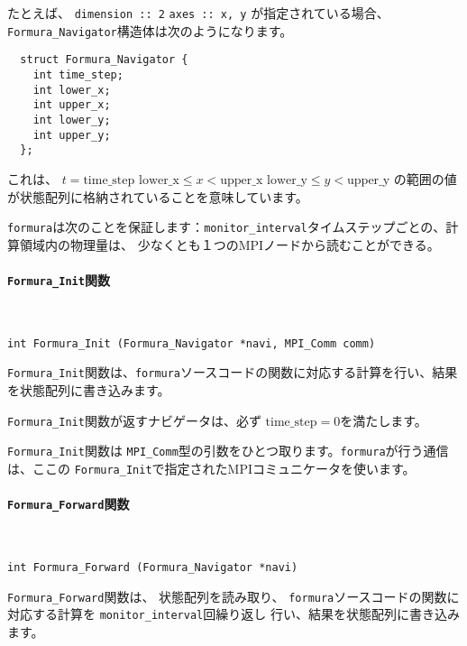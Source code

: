 \documentclass{jsarticle}
\newcommand{\formura}{{\texttt{formura}}}
\begin{document}
たとえば、
\verb`dimension :: 2`
\verb`axes :: x, y`
が指定されている場合、
\verb`Formura_Navigator`構造体は次のようになります。

\begin{screen}
\begin{verbatim}
  struct Formura_Navigator {
    int time_step;
    int lower_x;
    int upper_x;
    int lower_y;
    int upper_y;
  };
\end{verbatim}
\end{screen}

これは、
$t = \mathrm{time\_step}$
$\mathrm{lower\_x} \leq x < \mathrm{upper\_x}$
$\mathrm{lower\_y} \leq y < \mathrm{upper\_y}$
の範囲の値が状態配列に格納されていることを意味しています。

\formura は次のことを保証します：\verb`monitor_interval`タイムステップごとの、計算領域内の物理量は、
少なくとも１つのMPIノードから読むことができる。


\paragraph{\texttt{Formura\_Init}関数} \leavevmode\\

\begin{screen}
\begin{verbatim}
int Formura_Init (Formura_Navigator *navi, MPI_Comm comm)
\end{verbatim}
\end{screen}
\verb`Formura_Init`関数は、\formura ソースコードの関数に対応する計算を行い、結果を状態配列に書き込みます。

\verb`Formura_Init`関数が返すナビゲータは、必ず
$\mathrm{time\_step} = 0$を満たします。


\verb`Formura_Init`関数は
\verb`MPI_Comm`型の引数をひとつ取ります。\formura が行う通信は、ここの
\verb`Formura_Init`で指定されたMPIコミュニケータを使います。


\paragraph{\texttt{Formura\_Forward}関数} \leavevmode\\

\begin{screen}
\begin{verbatim}
int Formura_Forward (Formura_Navigator *navi)
\end{verbatim}
\end{screen}
\verb`Formura_Forward`関数は、
状態配列を読み取り、
\formura ソースコードの関数に対応する計算を
\verb`monitor_interval`回繰り返し
行い、結果を状態配列に書き込みます。
\end{document}
